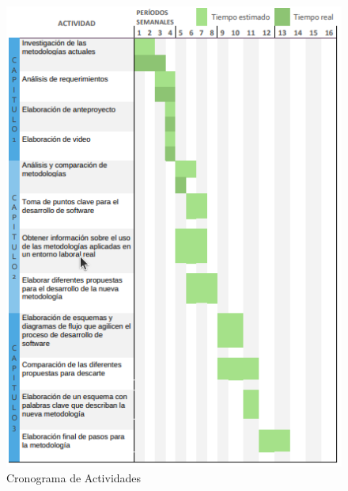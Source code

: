 \begin{figure}[h]
	\centering
	\includegraphics[width=.8\textwidth]{cronograma}
	\caption{Cronograma de Actividades}
	\label{fig:etiquetafigura}
\end{figure}